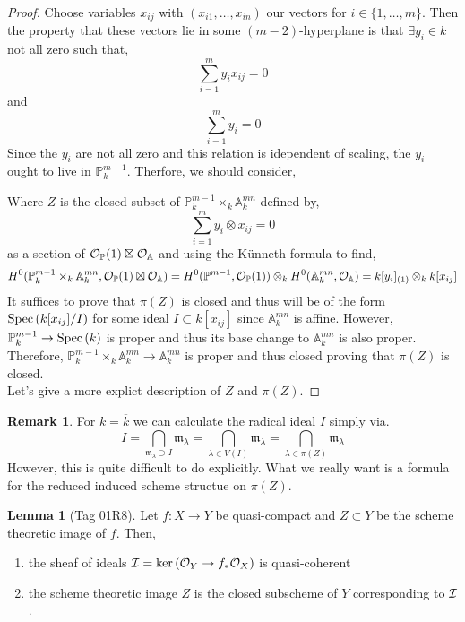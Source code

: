 \documentclass[12pt]{extarticle}
\theoremstyle{definition}
\newtheorem{lemma}[theorem]{Lemma}
\newtheorem{remark}{Remark}
\newcommand{\m}{\mathfrak{m}}
\renewcommand{\P}{\mathbb{P}}
\newcommand{\A}{\mathbb{A}}
\begin{document}
\begin{proof}
Choose variables $x_{ij}$ with $(x_{i1}, \dots, x_{in})$ our vectors for $i \in \{ 1, \dots, m \}$. Then the property that these vectors lie in some $(m-2)$-hyperplane is that $\exists y_i \in k$ not all zero such that,
\[ \sum_{i = 1}^m y_i x_{ij} = 0 \] 
and
\[ \sum_{i = 1}^m y_i = 0 \]
Since the $y_i$ are not all zero and this relation is idependent of scaling, the $y_i$ ought to live in $\P^{m-1}_k$. Therfore, we should consider,
\begin{center}
\end{center}
Where $Z$ is the closed subset of $\P^{m-1}_k \times_k \A^{mn}_k$ defined by,
\[ \sum_{i = 1}^m y_i \otimes x_{ij} = 0 \]
as a section of $\struct{\P}(1) \boxtimes \struct{\A}$ and using the K\"{u}nneth formula to find,
\[ H^0(\P^{m - 1}_k \times_k \A^{mn}_k, \struct{\P}(1) \boxtimes \struct{\A}) = H^0(\P^{m - 1}, \struct{\P}(1)) \otimes_k H^0(\A^{mn}_k, \struct{\A}) = k[y_i]_{(1)} \otimes_k k[x_{ij}]  \]
It suffices to prove that $\pi(Z)$ is closed and thus will be of the form $\mathrm{Spec}\left(k[x_{ij}]/I\right)$ for some ideal $I \subset k[x_{ij}]$ since $\A^{mn}_k$ is affine. However, $\P^{m-1}_k \to \Spec{k}$ is proper and thus its base change to $\A^{mn}_k$ is also proper. Therefore, $\P^{m-1}_k \times_k \A^{mn}_k \to \A^{mn}_k$ is proper and thus closed proving that $\pi(Z)$ is closed.
\bigskip\\
Let's give a more explict description of $Z$ and $\pi(Z)$. 
\end{proof}

\begin{remark}
For $k = \overline{k}$ we can calculate the radical ideal $I$ simply via.
\[ I = \bigcap_{\m_\lambda \supset I} \m_\lambda = \bigcap_{\lambda \in V(I)} \m_\lambda = \bigcap_{\lambda \in \pi(Z)} \m_{\lambda} \]
However, this is quite difficult to do explicitly. What we really want is a formula for the reduced induced scheme structue on $\pi(Z)$. 
\end{remark}

\begin{lemma}[Tag 01R8]
Let $f : X \to Y$ be quasi-compact and $Z \subset Y$ be the scheme theoretic image of $f$. Then,
\begin{enumerate}
\item the sheaf of ideals $\mathcal{I} = \ker{(\mathcal{O}_{Y} \to f_* \mathcal{O}_{X})}$ is quasi-coherent
\item the scheme theoretic image $Z$ is the closed subscheme of $Y$ corresponding to $\mathcal{I}$.
\end{enumerate}
\end{lemma}
\end{document}
